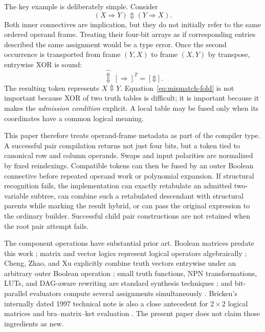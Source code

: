 \documentclass[10pt]{article}
\newcommand{\bxor}{\mathbin{\Updownarrow}}
\newcommand{\ptop}[1]{\widehat{#1}}
\theoremstyle{plain}
\theoremstyle{definition}
\theoremstyle{remark}
\begin{document}
The key example is deliberately simple. Consider
\begin{equation}
 (X\Rightarrow Y)\bxor(Y\Rightarrow X).
 \label{eq:mismatch-expression}
\end{equation}
Both inner connectives are implication, but they do not initially refer to the same ordered operand frame. Treating their four-bit arrays as if corresponding entries described the same assignment would be a type error. Once the second occurrence is transported from frame $(Y,X)$ to frame $(X,Y)$ by transpose, entrywise XOR is sound:
\begin{equation}
 [\Rightarrow]\,\ptop{\bxor}\,[\Rightarrow]^T=[\bxor].
 \label{eq:mismatch-fold}
\end{equation}
The resulting token represents $X\bxor Y$. Equation~\eqref{eq:mismatch-fold} is not important because XOR of two truth tables is difficult; it is important because it makes the \emph{admission condition} explicit. A local table may be fused only when its coordinates have a common logical meaning.

This paper therefore treats operand-frame metadata as part of the compiler type. A successful pair compilation returns not just four bits, but a token tied to canonical row and column operands. Swaps and input polarities are normalized by fixed reindexings. Compatible tokens can then be fused by an outer Boolean connective before repeated operand work or polynomial expansion. If structural recognition fails, the implementation can exactly retabulate an admitted two-variable subtree, can combine such a retabulated descendant with structural parents while marking the result hybrid, or can pass the original expression to the ordinary builder. Successful child pair constructions are not retained when the root pair attempt fails.

The component operations have substantial prior art. Boolean matrices predate this work \cite{Edwards1972}; matrix and vector logics represent logical operators algebraically \cite{Stern1988,Mizraji1992,Mizraji2008}; Cheng, Zhao, and Xu explicitly combine truth vectors entrywise under an arbitrary outer Boolean operation \cite{Cheng2011}; small truth functions, NPN transformations, LUTs, and DAG-aware rewriting are standard synthesis techniques \cite{Mishchenko2006,Zhou2019,Testa2019}; and bit-parallel evaluators compute several assignments simultaneously \cite{Lee2022}. Bricken's internally dated 1997 technical note is also a close antecedent for $2\times2$ logical matrices and bra--matrix--ket evaluation \cite{Bricken1997}. The present paper does not claim those ingredients as new.
\end{document}
